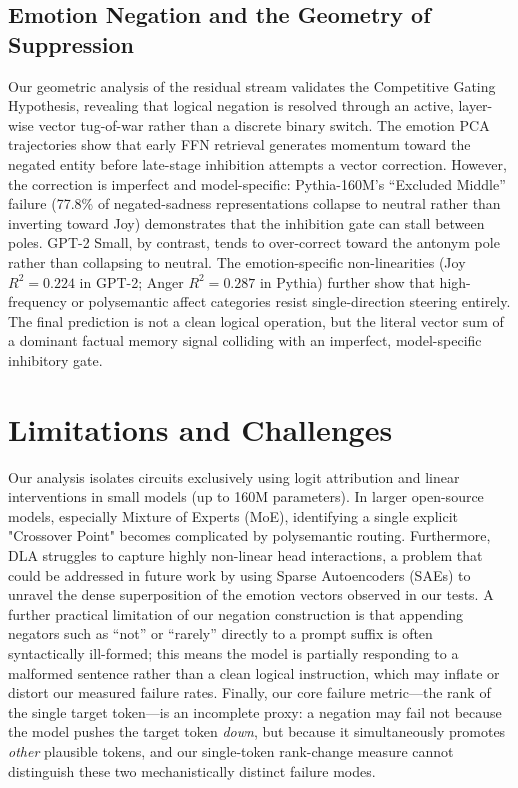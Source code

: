 \documentclass[11pt]{article}
\begin{document}
\subsection{Emotion Negation and the Geometry of Suppression}
Our geometric analysis of the residual stream validates the Competitive Gating Hypothesis, revealing that logical negation is resolved through an active, layer-wise vector tug-of-war rather than a discrete binary switch. The emotion PCA trajectories show that early FFN retrieval generates momentum toward the negated entity before late-stage inhibition attempts a vector correction. However, the correction is imperfect and model-specific: Pythia-160M's ``Excluded Middle'' failure (77.8\% of negated-sadness representations collapse to neutral rather than inverting toward Joy) demonstrates that the inhibition gate can stall between poles. GPT-2 Small, by contrast, tends to over-correct toward the antonym pole rather than collapsing to neutral. The emotion-specific non-linearities (Joy $R^2=0.224$ in GPT-2; Anger $R^2=0.287$ in Pythia) further show that high-frequency or polysemantic affect categories resist single-direction steering entirely. The final prediction is not a clean logical operation, but the literal vector sum of a dominant factual memory signal colliding with an imperfect, model-specific inhibitory gate.

\section{Limitations and Challenges}
\label{sec:limitations}
Our analysis isolates circuits exclusively using logit attribution and linear interventions in small models (up to 160M parameters). In larger open-source models, especially Mixture of Experts (MoE), identifying a single explicit "Crossover Point" becomes complicated by polysemantic routing. Furthermore, DLA struggles to capture highly non-linear head interactions, a problem that could be addressed in future work by using Sparse Autoencoders (SAEs) to unravel the dense superposition of the emotion vectors observed in our tests. A further practical limitation of our negation construction is that appending negators such as ``not'' or ``rarely'' directly to a prompt suffix is often syntactically ill-formed; this means the model is partially responding to a malformed sentence rather than a clean logical instruction, which may inflate or distort our measured failure rates. Finally, our core failure metric---the rank of the single target token---is an incomplete proxy: a negation may fail not because the model pushes the target token \emph{down}, but because it simultaneously promotes \emph{other} plausible tokens, and our single-token rank-change measure cannot distinguish these two mechanistically distinct failure modes.
\end{document}
